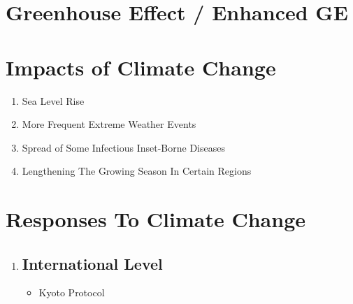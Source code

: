 \documentclass[oneside]{book}
\begin{document}
\begin{minipage}{0.5\textwidth}
    \section{Greenhouse Effect / Enhanced GE}
    \section{Impacts of Climate Change}
    \begin{enumerate}
        \item Sea Level Rise
        \item More Frequent Extreme Weather Events 
        \item Spread of Some Infectious Inset-Borne Diseases
        \item Lengthening The Growing Season In Certain Regions
    \end{enumerate}
    \section{Responses To Climate Change}
    \begin{enumerate}
        \item \subsection*{International Level}
        \begin{itemize}
            \item Kyoto Protocol
        \end{itemize}
    \end{enumerate}
\end{minipage}
\end{document}
